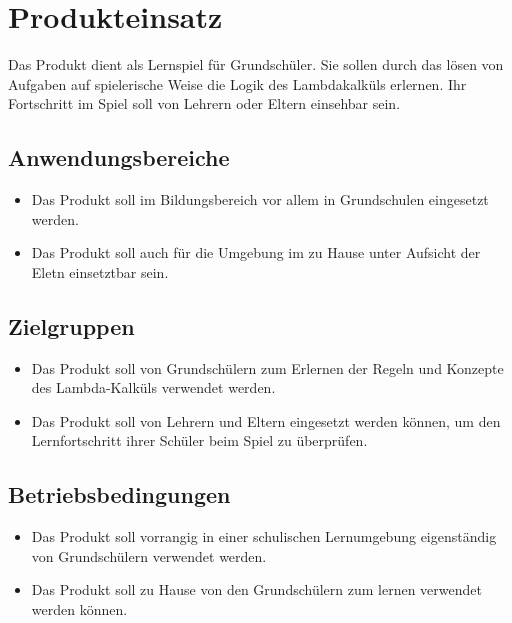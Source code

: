 \section{Produkteinsatz}

Das Produkt dient als Lernspiel für Grundschüler. Sie sollen durch das lösen von Aufgaben auf spielerische Weise die Logik des Lambdakalküls erlernen. Ihr Fortschritt im Spiel soll von Lehrern oder Eltern einsehbar sein.

\subsection{Anwendungsbereiche}
\begin{itemize}
	\item Das Produkt soll im Bildungsbereich vor allem in Grundschulen eingesetzt werden.
	\item Das Produkt soll auch für die Umgebung im zu Hause unter Aufsicht der Eletn einsetztbar sein.
\end{itemize}


\subsection{Zielgruppen}

\begin{itemize}
	\item Das Produkt soll von Grundschülern zum Erlernen der Regeln und Konzepte des Lambda-Kalküls verwendet werden.
	\item Das Produkt soll von Lehrern und Eltern eingesetzt werden können, um den Lernfortschritt ihrer Schüler beim Spiel zu überprüfen. 
\end{itemize}

\subsection{Betriebsbedingungen}
\begin{itemize}
	\item Das Produkt soll vorrangig  in einer schulischen Lernumgebung eigenständig von Grundschülern verwendet werden.
	\item Das Produkt soll  zu Hause von den Grundschülern zum lernen verwendet werden können.
\end{itemize}
